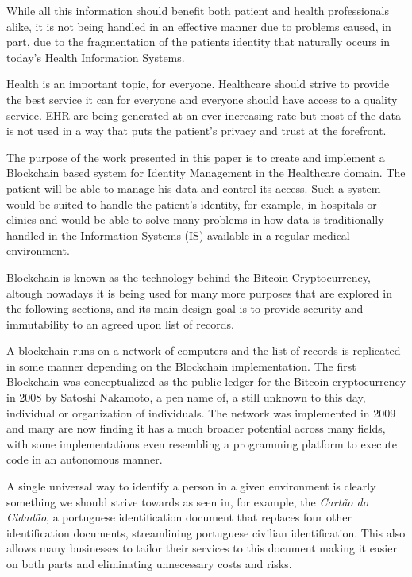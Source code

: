 \documentclass[]{llncs}
\begin{document}
While all this information should benefit both patient and health professionals
alike, it is not being handled in an effective manner due to problems caused,
in part, due to the fragmentation of the patients identity that naturally
occurs in today's Health Information Systems.

Health is an important topic, for everyone. Healthcare should strive to provide
the best service it can for everyone and everyone should have access to a
quality service. EHR are being generated at an ever increasing rate but most of
the data is not used in a way that puts the patient's privacy and trust at the
forefront.

The purpose of the work presented in this paper is to create and implement a
Blockchain based system for Identity Management in the Healthcare domain. The
patient will be able to manage his data and control its access. Such a system
would be suited to handle the patient’s identity, for example, in hospitals or
clinics and would be able to solve many problems in how data is traditionally
handled in the Information Systems (IS) available in a regular medical
environment.

Blockchain is known as the technology behind the Bitcoin Cryptocurrency,
altough nowadays it is being used for many more purposes that are explored in
the following sections, and its main design goal is to provide security and
immutability to an agreed upon list of records.

A blockchain runs on a network of computers and the list of records is
replicated in some manner depending on the Blockchain implementation. The first
Blockchain was conceptualized as the public ledger for the Bitcoin
cryptocurrency in 2008 by Satoshi Nakamoto, a pen name of, a still unknown to
this day, individual or organization of individuals.  The network was
implemented in 2009 and many are now finding it has a much broader potential
across many fields, with some implementations even resembling a programming
platform to execute code in an autonomous manner.  \cite{Nakamoto2008}

A single universal way to identify a person in a given environment is clearly
something we should strive towards as seen in, for example, the \textit{Cartão
do Cidadão}, a portuguese identification document that replaces four other
identification documents, streamlining portuguese civilian identification.
This also allows many businesses to tailor their services to this document
making it easier on both parts and eliminating unnecessary costs and risks.
\end{document}
